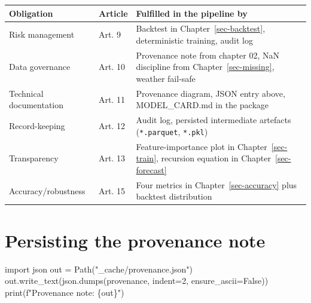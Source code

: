 \documentclass[
  english,
  letterpaper,
]{scrbook}
\newenvironment{Shaded}{\begin{snugshade}}{\end{snugshade}}
\newcommand{\BuiltInTok}[1]{\textcolor[rgb]{0.00,0.23,0.31}{#1}}
\newcommand{\DecValTok}[1]{\textcolor[rgb]{0.68,0.00,0.00}{#1}}
\newcommand{\ImportTok}[1]{\textcolor[rgb]{0.00,0.46,0.62}{#1}}
\newcommand{\NormalTok}[1]{\textcolor[rgb]{0.00,0.23,0.31}{#1}}
\newcommand{\OperatorTok}[1]{\textcolor[rgb]{0.37,0.37,0.37}{#1}}
\newcommand{\SpecialCharTok}[1]{\textcolor[rgb]{0.37,0.37,0.37}{#1}}
\newcommand{\SpecialStringTok}[1]{\textcolor[rgb]{0.13,0.47,0.30}{#1}}
\newcommand{\StringTok}[1]{\textcolor[rgb]{0.13,0.47,0.30}{#1}}
\newcommand{\VariableTok}[1]{\textcolor[rgb]{0.07,0.07,0.07}{#1}}
\newcounter{none} %
\begin{document}
{\def\LTcaptype{none} %
\begin{longtable}[]{@{}
  >{\raggedright\arraybackslash}p{}
  >{\raggedright\arraybackslash}p{}
  >{\raggedright\arraybackslash}p{}@{}}
\toprule\noalign{}
\begin{minipage}[b]{\linewidth}\raggedright
Obligation
\end{minipage} & \begin{minipage}[b]{\linewidth}\raggedright
Article
\end{minipage} & \begin{minipage}[b]{\linewidth}\raggedright
Fulfilled in the pipeline by
\end{minipage} \\
\midrule\noalign{}
\endhead
\bottomrule\noalign{}
\endlastfoot
Risk management & Art. 9 & Backtest in Chapter~\ref{sec-backtest},
deterministic training, audit log \\
Data governance & Art. 10 & Provenance note from chapter 02, NaN
discipline from Chapter~\ref{sec-missing}, weather fail-safe \\
Technical documentation & Art. 11 & Provenance diagram, JSON entry
above, MODEL\_CARD.md in the package \\
Record-keeping & Art. 12 & Audit log, persisted intermediate artefacts
(\texttt{*.parquet}, \texttt{*.pkl}) \\
Transparency & Art. 13 & Feature-importance plot in
Chapter~\ref{sec-train}, recursion equation in
Chapter~\ref{sec-forecast} \\
Accuracy/robustness & Art. 15 & Four metrics in
Chapter~\ref{sec-accuracy} plus backtest distribution \\
\end{longtable}
}

\section{Persisting the provenance
note}\label{persisting-the-provenance-note}

\protect{}\label{persist-provenance}
\begin{Shaded}
\begin{Highlighting}[]
\ImportTok{import}\NormalTok{ json}
\NormalTok{out }\OperatorTok{=}\NormalTok{ Path(}\StringTok{"\_cache/provenance.json"}\NormalTok{)}
\NormalTok{out.write\_text(json.dumps(provenance, indent}\OperatorTok{=}\DecValTok{2}\NormalTok{, ensure\_ascii}\OperatorTok{=}\VariableTok{False}\NormalTok{))}
\BuiltInTok{print}\NormalTok{(}\SpecialStringTok{f"Provenance note: }\SpecialCharTok{\{}\NormalTok{out}\SpecialCharTok{\}}\SpecialStringTok{"}\NormalTok{)}
\end{Highlighting}
\end{Shaded}
\end{document}
